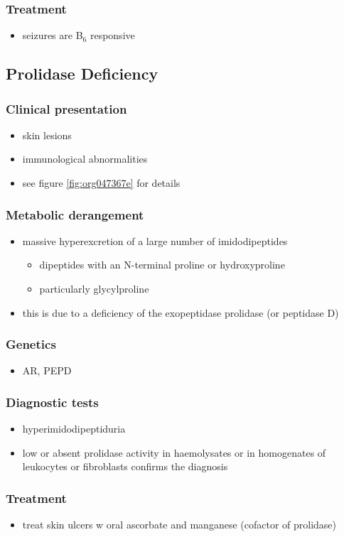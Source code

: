 \documentclass{scrartcl}
\begin{document}
\subsubsection{Treatment}
\label{sec:orgf138127}
\begin{itemize}
\item seizures are B\(_{\text{6}}\) responsive
\end{itemize}

\subsection{Prolidase Deficiency}
\label{sec:org909f5ba}
\subsubsection{Clinical presentation}
\label{sec:orgba9e58e}
\begin{itemize}
\item skin lesions
\item immunological abnormalities
\item see figure \ref{fig:org047367e} for details
\end{itemize}
\subsubsection{Metabolic derangement}
\label{sec:org3d29fd7}
\begin{itemize}
\item massive hyperexcretion of a large number of imidodipeptides
\begin{itemize}
\item dipeptides with an N-terminal proline or hydroxyproline
\item particularly glycylproline
\end{itemize}
\item this is due to a deficiency of the exopeptidase prolidase (or
peptidase D)
\end{itemize}
\subsubsection{Genetics}
\label{sec:org3943db3}
\begin{itemize}
\item AR, PEPD
\end{itemize}
\subsubsection{Diagnostic tests}
\label{sec:org322a015}
\begin{itemize}
\item hyperimidodipeptiduria
\item low or absent prolidase activity in haemolysates or in homogenates
of leukocytes or fibroblasts confirms the diagnosis
\end{itemize}
\subsubsection{Treatment}
\label{sec:org1a820ba}
\begin{itemize}
\item treat skin ulcers w oral ascorbate and manganese (cofactor of prolidase)
\end{itemize}
\end{document}

